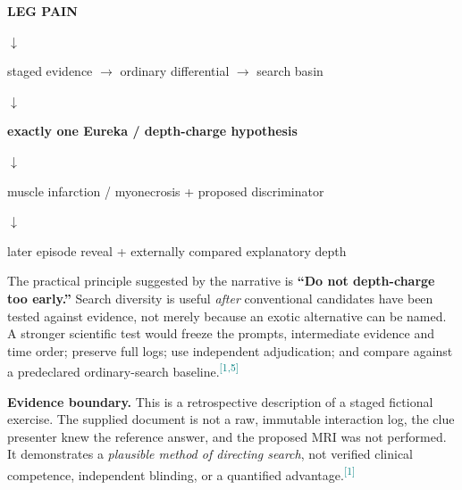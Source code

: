 \documentclass[11pt,letterpaper]{article}
\newcommand{\src}[1]{\textsuperscript{\textcolor{teal}{[#1]}}}
\begin{document}
\begin{tcolorbox}[colback=aqua]
\centering
{\small\bfseries\color{ink}LEG PAIN}\par\vspace{1pt}
$\downarrow$\par
{\small staged evidence $\to$ ordinary differential $\to$ search basin}\par\vspace{2pt}
$\downarrow$\par
{\small\bfseries exactly one Eureka / depth-charge hypothesis}\par\vspace{2pt}
$\downarrow$\par
{\small muscle infarction / myonecrosis + proposed discriminator}\par\vspace{2pt}
$\downarrow$\par
{\small later episode reveal + externally compared explanatory depth}
\end{tcolorbox}
\vspace{3pt}
\small
The practical principle suggested by the narrative is \textbf{``Do not depth-charge too early.''} Search diversity is useful \emph{after} conventional candidates have been tested against evidence, not merely because an exotic alternative can be named. A stronger scientific test would freeze the prompts, intermediate evidence and time order; preserve full logs; use independent adjudication; and compare against a predeclared ordinary-search baseline.\src{1,5}

\textbf{Evidence boundary.} This is a retrospective description of a staged fictional exercise. The supplied document is not a raw, immutable interaction log, the clue presenter knew the reference answer, and the proposed MRI was not performed. It demonstrates a \emph{plausible method of directing search}, not verified clinical competence, independent blinding, or a quantified advantage.\src{1}
\end{document}
